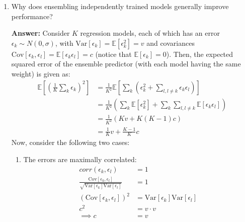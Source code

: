 \documentclass{article}
\newenvironment{QandA}{\begin{enumerate}[label=\arabic*.]}{\end{enumerate}}
\newenvironment{InnerQandA}{\begin{enumerate}[label=\roman*.]}{\end{enumerate}}
\newenvironment{ListAlph}{\begin{enumerate}[label=(\alph*)]}{\end{enumerate}}
\newenvironment{answer}{\par\normalfont \textbf{Answer:}}{}
\newcommand{\Exp}[1]{\mathbb{E}\left[ #1 \right]}
\newcommand{\Vari}[1]{\text{Var}\left[ #1 \right]}
\newcommand{\Cov}[1]{\text{Cov}\left[ #1 \right]}
\begin{document}
\begin{QandA}
\begin{InnerQandA}
\begin{answer}
\begin{ListAlph}
                \item \textit{Inference time requirements}: Since parametric models use a fixed parametrization, they are more applicable in cases when we need consistent inference time guarantees. In contrast, the prediction time of non-parametric methods might depend on the dataset size (e.g. finding k-nearest neighbors, iterating over all support vectors, \ldots)
            \end{ListAlph}
            
        \end{answer}
    \end{InnerQandA}
    
    \item Why does ensembling independently trained models generally improve performance?
    \begin{answer}
        Consider $K$ regression models, each of which has an error $\epsilon_k \sim N(0, \sigma)$, with $\Vari{\epsilon_k} = \Exp{\epsilon_k^2} = v$ and covariances $\Cov{\epsilon_k, \epsilon_l} = \Exp{\epsilon_k \epsilon_l} = c$ (notice that $\Exp{\epsilon_k}=0$). Then, the expected squared error of the ensemble predictor (with each model having the same weight) is given as:
        \begin{align*}
            \Exp{\left( \frac{1}{K} \sum_{k} \epsilon_k \right)^2} &= \frac{1}{K^2} \Exp{ \sum_k \left(\epsilon_k^2 + \sum_{l, l \neq k} \epsilon_k \epsilon_l \right)} \\
            &= \frac{1}{K^2} \left( \sum_{k} \Exp{\epsilon_k^2} + \sum_k \sum_{l, l \neq k} \Exp{\epsilon_k \epsilon_l} \right) \\
            &= \frac{1}{K^2} \left( Kv + K(K-1)c \right) \\
            &= \frac{1}{K}v + \frac{K-1}{K}c
        \end{align*}
        Now, consider the following two cases:
        \begin{ListAlph}
            \item The errors are maximally correlated:
            \begin{align*}
                corr(\epsilon_k, \epsilon_l) &= 1 \\
                \frac{\Cov{\epsilon_k, \epsilon_l}}{\sqrt{\Vari{\epsilon_k} \Vari{\epsilon_l}}} &= 1 \\
                (\Cov{\epsilon_k, \epsilon_l})^2 &= \Vari{\epsilon_k} \Vari{\epsilon_l} \\
                c^2 &= v \cdot v \\
                \implies c &= v
            \end{align*}


\end{ListAlph}
\end{answer}
\end{QandA}
\end{document}
